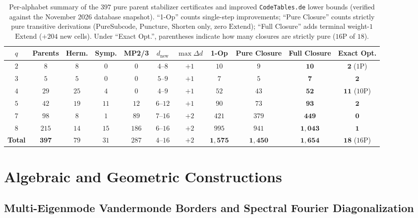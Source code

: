 \documentclass[11pt,a4paper]{article}
\theoremstyle{remark}
\begin{document}
\begin{table}[htbp]
\centering
\caption{Per-alphabet summary of the $397$ pure parent stabilizer certificates and improved \texttt{CodeTables.de} lower bounds (verified against the November 2026 database snapshot). ``1-Op'' counts single-step improvements; ``Pure Closure'' counts strictly pure transitive derivations ($\mathrm{PureSubcode}$, $\mathrm{Puncture}$, $\mathrm{Shorten}$ only, zero $\mathrm{Extend}$); ``Full Closure'' adds terminal weight-$1$ $\mathrm{Extend}$ ($+204$ new cells). Under ``Exact Opt.'', parentheses indicate how many closures are strictly pure ($16$P of $18$).}\label{tab:summary_by_q}
\vspace{4pt}
{\footnotesize\setlength{\tabcolsep}{4.4pt}\renewcommand{\arraystretch}{1.08}
\begin{tabular}{@{}ccccccccccc@{}}
\toprule
$q$ & Parents & Herm. & Symp. & MP2/3 & $d_{\mathrm{new}}$ & $\max \Delta d$ & 1-Op & Pure Closure & \textbf{Full Closure} & \textbf{Exact Opt.} \\
\midrule
$2$ & $8$ & $8$ & $0$ & $0$ & $4\text{--}8$ & $+1$ & $10$ & $9$ & $\mathbf{10}$ & $\mathbf{2}$ ($1$P) \\
$3$ & $5$ & $5$ & $0$ & $0$ & $5\text{--}9$ & $+1$ & $7$ & $5$ & $\mathbf{7}$ & $\mathbf{2}$ \\
$4$ & $29$ & $25$ & $4$ & $0$ & $4\text{--}9$ & $+1$ & $52$ & $43$ & $\mathbf{52}$ & $\mathbf{11}$ ($10$P) \\
$5$ & $42$ & $19$ & $11$ & $12$ & $6\text{--}12$ & $+1$ & $90$ & $73$ & $\mathbf{93}$ & $\mathbf{2}$ \\
$7$ & $98$ & $8$ & $1$ & $89$ & $7\text{--}16$ & $+2$ & $421$ & $379$ & $\mathbf{449}$ & $\mathbf{0}$ \\
$8$ & $215$ & $14$ & $15$ & $186$ & $6\text{--}16$ & $+2$ & $995$ & $941$ & $\mathbf{1{,}043}$ & $\mathbf{1}$ \\
\midrule
\textbf{Total} & $\mathbf{397}$ & $79$ & $31$ & $287$ & $4\text{--}16$ & $+2$ & $\mathbf{1{,}575}$ & $\mathbf{1{,}450}$ & $\mathbf{1{,}654}$ & $\mathbf{18}$ ($16$P) \\
\bottomrule
\end{tabular}}
\end{table}

\section{Algebraic and Geometric Constructions}\label{sec:constructions}

\subsection{Multi-Eigenmode Vandermonde Borders and Spectral Fourier Diagonalization}
\end{document}

